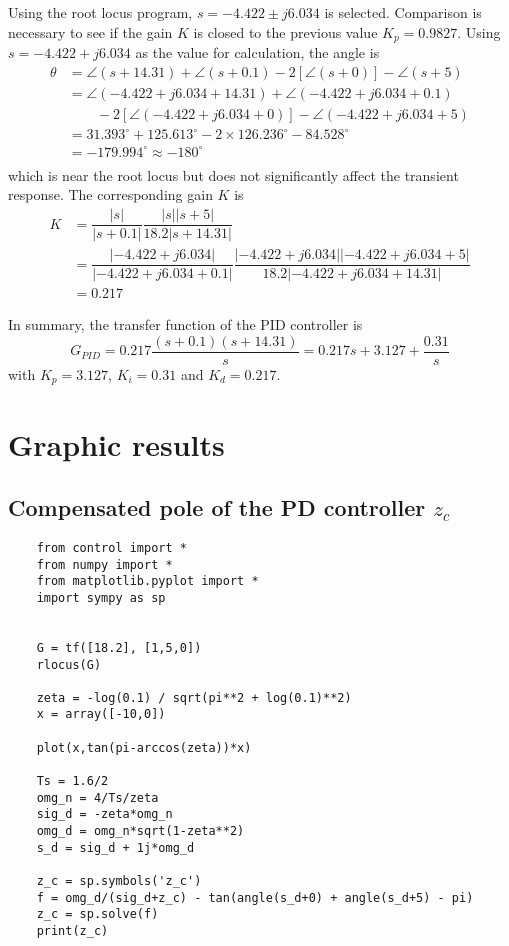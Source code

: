 Using the root locus program, $ s = -4.422 \pm j6.034 $ is selected. Comparison is necessary to see if the gain $ K $ is closed to the previous value $ K_p = 0.9827 $. Using $ s = -4.422 + j6.034  $ as the value for calculation, the angle is
\[
\begin{array}{ll}
\theta & = \angle (s+14.31) + \angle (s+0.1) - 2[\angle (s+0)] - \angle (s+5)\\
& = \angle (-4.422 + j6.034 + 14.31) + \angle (-4.422 + j6.034+0.1) \\
& \qquad - 2[\angle (-4.422 + j6.034+0)] - \angle (-4.422 + j6.034+5)\\
& = 31.393^\circ + 125.613^\circ - 2\times 126.236^\circ - 84.528^\circ\\
& = -179.994^\circ \approx -180^\circ \\
\end{array}
\]
which is near the root locus but does not significantly affect the transient response. The corresponding gain $ K $ is
\[
\begin{array}{ll}
K &= \dfrac{|s|}{|s+0.1|}\dfrac{|s||s+5|}{18.2|s+14.31|}\\
&= \dfrac{|-4.422 + j6.034|}{|-4.422 + j6.034+0.1|}\dfrac{|-4.422 + j6.034||-4.422 + j6.034+5|}{18.2|-4.422 + j6.034+14.31|}\\
&= 0.217
\end{array}
\]

In summary, the transfer function of the PID controller is
\begin{equation}
	G_{PID} = 0.217\dfrac{(s+0.1)(s+14.31)}{s} = 0.217s + 3.127 + \dfrac{0.31}{s}
\end{equation}
with $ K_p = 3.127 $, $ K_i = 0.31 $ and $ K_d = 0.217 $.

\section{Graphic results}
\subsection{Compensated pole of the PD controller $ z_c $}
\begin{verbatim}
	from control import *
	from numpy import *
	from matplotlib.pyplot import *
	import sympy as sp
	
		
	G = tf([18.2], [1,5,0])
	rlocus(G)
	
	zeta = -log(0.1) / sqrt(pi**2 + log(0.1)**2)
	x = array([-10,0])
	
	plot(x,tan(pi-arccos(zeta))*x)
	
	Ts = 1.6/2
	omg_n = 4/Ts/zeta
	sig_d = -zeta*omg_n
	omg_d = omg_n*sqrt(1-zeta**2)
	s_d = sig_d + 1j*omg_d
	
	z_c = sp.symbols('z_c')
	f = omg_d/(sig_d+z_c) - tan(angle(s_d+0) + angle(s_d+5) - pi)
	z_c = sp.solve(f)
	print(z_c)
\end{verbatim}

